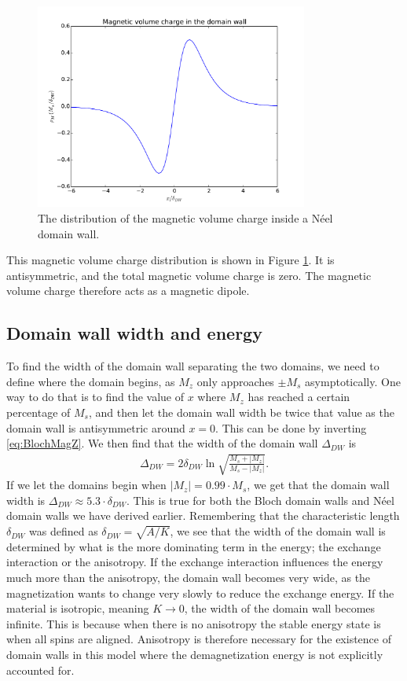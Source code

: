 \documentclass[12pt, a4paper]{article}		%
\numberwithin{equation}{section}
\begin{document}
\begin{figure}[h!]
\begin{center}
\includegraphics[width=0.8\textwidth]{Figures/MagneticVolumeCharge.pdf} 
\caption{The distribution of the magnetic volume charge inside a N\'{e}el domain wall.}
\label{fig:magVolumeCharge} 
\end{center}
\end{figure}
This magnetic volume charge distribution is shown in Figure \ref{fig:magVolumeCharge}. It is antisymmetric, and the total magnetic volume charge is zero. The magnetic volume charge therefore acts as a magnetic dipole.

\subsection{Domain wall width and energy}
To find the width of the domain wall separating the two domains, we need to define where the domain begins, as $M_z$ only approaches $\pm M_s$ asymptotically. One way to do that is to find the value of $x$ where $M_z$ has reached a certain percentage of $M_s$, and then let the domain wall width be twice that value as the domain wall is antisymmetric around $x=0$. This can be done by inverting \eqref{eq:BlochMagZ}. We then find that the width of the domain wall $\Delta_{DW}$ is
\begin{align}
\Delta_{DW} = 2\delta_{DW}\ln\sqrt{\frac{M_s+|M_z|}{M_s-|M_z|}}.
\end{align}
If we let the domains begin when $|M_z| = 0.99\cdot M_s$, we get that the domain wall width is $\Delta_{DW} \approx 5.3 \cdot \delta_{DW}$. This is true for both the Bloch domain walls and N\'{e}el domain walls we have derived earlier. Remembering that the characteristic length $\delta_{DW}$ was defined as $\delta_{DW} = \sqrt{A/K}$, we see that the width of the domain wall is determined by what is the more dominating term in the energy; the exchange interaction or the anisotropy. If the exchange interaction influences the energy much more than the anisotropy, the domain wall becomes very wide, as the magnetization wants to change very slowly to reduce the exchange energy. If the material is isotropic, meaning $K\rightarrow0$, the width of the domain wall becomes infinite. This is because when there is no anisotropy the stable energy state is when all spins are aligned. Anisotropy is therefore necessary for the existence of domain walls in this model where the demagnetization energy is not explicitly accounted for.
\end{document}
